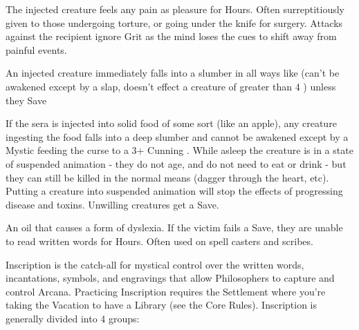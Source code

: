 {  \CHYMISTRY[
    Name=Davy's Soothing Anesthetic,
    Link=chymistry-davys-soothing-anesthetic,
    Cost=Silver (3),
    Duration=0 ,
    Toxin=Yes,
    Narcotic=No 
  ]

  The injected creature feels any pain as pleasure for Hours.  Often surreptitiously given to those undergoing torture, or going under the knife for surgery.  Attacks against the recipient ignore Grit as the mind loses the cues to shift away from painful events.  


  \CHYMISTRY[
    Name=Grimm's Stupurous Preparation,
    Link=chymistry-grimms-stupurous-preparation,
    Cost=Gold (5),
    Duration=0 ,
    Toxin=Yes,
    Narcotic=No 
  ]


  An injected creature immediately falls into a slumber in all ways like  (can't be awakened except by a slap, doesn't effect a creature of greater than 4 \HD) unless they Save

  If the sera is injected into solid food of some sort (like an apple), any creature ingesting the food falls into a deep slumber and cannot be awakened except by a Mystic feeding the curse to a 3+ Cunning . While asleep the creature is in a state of suspended animation - they do not age, and do not need to eat or drink - but they can still be killed in the normal means (dagger through the heart, etc).  Putting a creature into suspended animation will stop the effects of progressing disease and toxins.  Unwilling creatures get a Save. 

  \CHYMISTRY[
    Name=Wordwarp,
    Link=chymistry-wordwarp,
    Cost=Gold (5),
    Duration=0 ,
    Toxin=Yes,
    Narcotic=No 
  ]

  An oil that causes a form of dyslexia.  If the victim fails a Save, they are unable to read written words for Hours.  Often used on spell casters and scribes.


\newpage





Inscription is the catch-all for mystical control over the written words, incantations, symbols, and engravings that allow Philosophers to capture and control Arcana.  Practicing Inscription requires the Settlement where you're taking the Vacation to have a Library (see the Core Rules). Inscription is generally divided into 4 groups:

}
